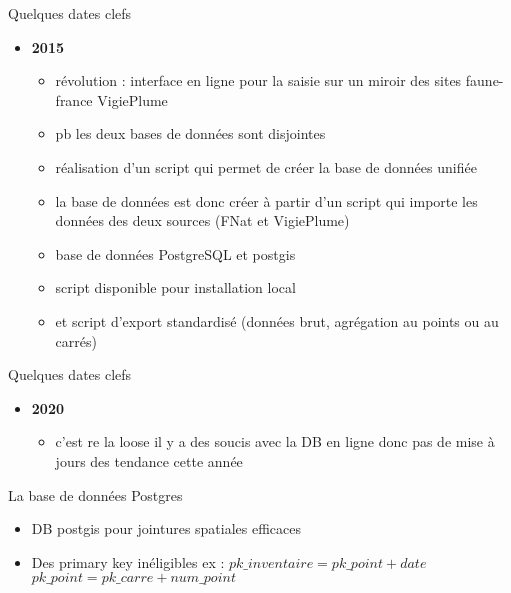 \documentclass[]{beamer}
\begin{document}
\begin{frame} {Quelques dates clefs}
  \begin{itemize}[<+->]
  \item \textbf{2015}
    \begin{itemize}
    \item révolution : interface en ligne pour la saisie sur un
      miroir des sites faune-france VigiePlume
    \item pb les deux bases de données sont disjointes
    \item réalisation d'un script qui permet de créer la base de
      données unifiée
    \item la base de données est donc créer à partir d'un script qui
      importe les données des deux sources (FNat et VigiePlume)
    \item base de données PostgreSQL et postgis
    \item script disponible pour installation local
    \item et script d'export standardisé (données brut, agrégation au
      points ou au carrés)
    \end{itemize}
   \end{itemize}
\end{frame}

\begin{frame} {Quelques dates clefs}
  \begin{itemize}[<+->]
  \item \textbf{2020}
    \begin{itemize}
    \item c'est re la loose il y a des soucis avec la DB en ligne donc
      pas de mise à jours des tendance cette année
    \end{itemize}
   \end{itemize}
\end{frame}


\begin{frame}{La base de données Postgres}
  \begin{itemize}[<+->]
  \item DB postgis pour jointures spatiales efficaces
  \item Des primary key inéligibles 
    ex : $pk\_inventaire =  pk\_point+date$ \\
    $pk\_point = pk\_carre + num\_point$
   \end{itemize}
\end{frame}
\end{document}
